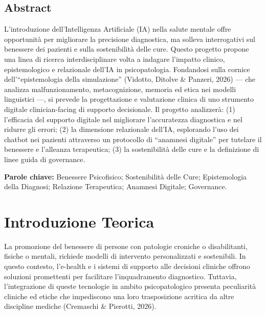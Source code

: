 \documentclass[11pt,a4paper]{article}
\begin{document}
\subsection*{Abstract}
L'introduzione dell'Intelligenza Artificiale (IA) nella salute mentale offre opportunità per migliorare la precisione diagnostica, ma solleva interrogativi sul benessere dei pazienti e sulla sostenibilità delle cure. Questo progetto propone una linea di ricerca interdisciplinare volta a indagare l'impatto clinico, epistemologico e relazionale dell'IA in psicopatologia. Fondandosi sulla cornice dell'``epistemologia della simulazione'' (Vidotto, Ditolve \& Panzeri, 2026) --- che analizza malfunzionamento, metacognizione, memoria ed etica nei modelli linguistici ---, si prevede la progettazione e valutazione clinica di uno strumento digitale clinician-facing di supporto decisionale. Il progetto analizzerà: (1) l'efficacia del supporto digitale nel migliorare l'accuratezza diagnostica e nel ridurre gli errori; (2) la dimensione relazionale dell'IA, esplorando l'uso dei chatbot nei pazienti attraverso un protocollo di ``anamnesi digitale'' per tutelare il benessere e l'alleanza terapeutica; (3) la sostenibilità delle cure e la definizione di linee guida di governance.

\vspace{0.4cm}
\noindent \textbf{Parole chiave:} Benessere Psicofisico; Sostenibilità delle Cure; Epistemologia della Diagnosi; Relazione Terapeutica; Anamnesi Digitale; Governance.

\newpage

\section{Introduzione Teorica}

La promozione del benessere di persone con patologie croniche o disabilitanti, fisiche o mentali, richiede modelli di intervento personalizzati e sostenibili. In questo contesto, l'e-health e i sistemi di supporto alle decisioni cliniche offrono soluzioni promettenti per facilitare l'inquadramento diagnostico. Tuttavia, l'integrazione di queste tecnologie in ambito psicopatologico presenta peculiarità cliniche ed etiche che impediscono una loro trasposizione acritica da altre discipline mediche (Cremaschi \& Pierotti, 2026).
\end{document}
